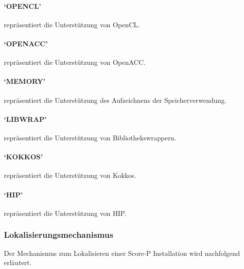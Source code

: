 \documentclass[german,proseminar,hyperref,utf8]{zihpub}
\begin{document}
    \paragraph{`OPENCL'} repräsentiert die Unterstützung von OpenCL.

    \paragraph{`OPENACC'} repräsentiert die Unterstützung von OpenACC.

    \paragraph{`MEMORY'} repräsentiert die Unterstützung des Aufzeichnens der Speicherverwendung.

    \paragraph{`LIBWRAP'} repräsentiert die Unterstützung von Bibliothekswrappern.

    \paragraph{`KOKKOS'} repräsentiert die Unterstützung von Kokkos.

    \paragraph{`HIP'} repräsentiert die Unterstützung von HIP.

    \subsubsection{Lokalisierungsmechanismus}
    Der Mechanismus zum Lokalisieren einer Score-P Installation wird nachfolgend erläutert.
\end{document}
